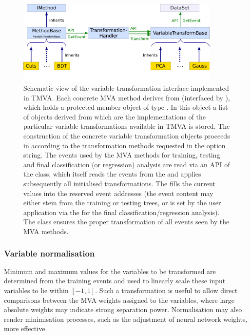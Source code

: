 \begin{figure}[t]
  \begin{center}
	  \includegraphics[width=0.90\textwidth]{plots/VariableTransforms}
  \end{center}
  \vspace{-1.1cm}
  \caption[.]{Schematic view of the variable transformation interface implemented in 
    TMVA. Each concrete MVA method derives from  
    (interfaced by ), which holds a protected member object 
    of type . In this object a list of objects 
    derived from  which are the implementations of 
    the particular variable transformations available in TMVA is stored. 
    The construction of the concrete 
    variable transformation objects proceeds in  according 
    to the transformation methods requested in the option string. The events
    used by the MVA methods for training, testing and final classification (or regression)
    analysis are read via an API of the  class, 
    which itself reads the events from the  and applies 
    subsequently all initialised transformations. The  
    fills the current values into the reserved event 
    addresses (the event content may either stem from the training or 
    testing trees, or is set by the user application via the  
    for the final classification/regression analysis). The 
    class ensures the proper transformation of all events seen by 
    the MVA methods.
}
\label{fig:VariableTransform}
\end{figure}

\subsubsection{Variable normalisation}
\label{sec:normalisation}

Minimum and maximum values for the variables to be transformed are determined from the training 
events and used to linearly scale these input variables to lie within $[-1,1]$. 
Such a transformation is useful to allow direct comparisons between the MVA weights 
assigned to the variables, where large absolute weights may indicate strong separation power. 
Normalisation may also render minimisation processes, such as the adjustment of 
neural network weights, more effective. 


